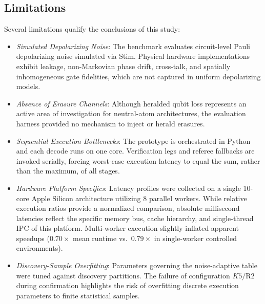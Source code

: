 \subsection{Limitations}

Several limitations qualify the conclusions of this study:
\begin{itemize}
    \item \textit{Simulated Depolarizing Noise}: The benchmark evaluates circuit-level Pauli depolarizing noise simulated via Stim. Physical hardware implementations exhibit leakage, non-Markovian phase drift, cross-talk, and spatially inhomogeneous gate fidelities, which are not captured in uniform depolarizing models.
    \item \textit{Absence of Erasure Channels}: Although heralded qubit loss represents an active area of investigation for neutral-atom architectures, the evaluation harness provided no mechanism to inject or herald erasures.
    \item \textit{Sequential Execution Bottlenecks}: The prototype is orchestrated in Python and each decode runs on one core. Verification legs and referee fallbacks are invoked serially, forcing worst-case execution latency to equal the sum, rather than the maximum, of all stages.
    \item \textit{Hardware Platform Specifics}: Latency profiles were collected on a single 10-core Apple Silicon architecture utilizing 8 parallel workers. While relative execution ratios provide a normalized comparison, absolute millisecond latencies reflect the specific memory bus, cache hierarchy, and single-thread IPC of this platform. Multi-worker execution slightly inflated apparent speedups ($0.70\times$ mean runtime vs.\ $0.79\times$ in single-worker controlled environments).
    \item \textit{Discovery-Sample Overfitting}: Parameters governing the noise-adaptive table were tuned against discovery partitions. The failure of configuration $K5/\text{R2}$ during confirmation highlights the risk of overfitting discrete execution parameters to finite statistical samples.
\end{itemize}

